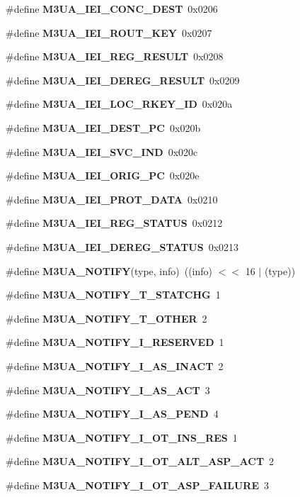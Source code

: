 \begin{DoxyCompactItemize}
\item 
\#define {\bf M3\+U\+A\+\_\+\+I\+E\+I\+\_\+\+C\+O\+N\+C\+\_\+\+D\+E\+ST}~0x0206
\item 
\#define {\bf M3\+U\+A\+\_\+\+I\+E\+I\+\_\+\+R\+O\+U\+T\+\_\+\+K\+EY}~0x0207
\item 
\#define {\bf M3\+U\+A\+\_\+\+I\+E\+I\+\_\+\+R\+E\+G\+\_\+\+R\+E\+S\+U\+LT}~0x0208
\item 
\#define {\bf M3\+U\+A\+\_\+\+I\+E\+I\+\_\+\+D\+E\+R\+E\+G\+\_\+\+R\+E\+S\+U\+LT}~0x0209
\item 
\#define {\bf M3\+U\+A\+\_\+\+I\+E\+I\+\_\+\+L\+O\+C\+\_\+\+R\+K\+E\+Y\+\_\+\+ID}~0x020a
\item 
\#define {\bf M3\+U\+A\+\_\+\+I\+E\+I\+\_\+\+D\+E\+S\+T\+\_\+\+PC}~0x020b
\item 
\#define {\bf M3\+U\+A\+\_\+\+I\+E\+I\+\_\+\+S\+V\+C\+\_\+\+I\+ND}~0x020c
\item 
\#define {\bf M3\+U\+A\+\_\+\+I\+E\+I\+\_\+\+O\+R\+I\+G\+\_\+\+PC}~0x020e
\item 
\#define {\bf M3\+U\+A\+\_\+\+I\+E\+I\+\_\+\+P\+R\+O\+T\+\_\+\+D\+A\+TA}~0x0210
\item 
\#define {\bf M3\+U\+A\+\_\+\+I\+E\+I\+\_\+\+R\+E\+G\+\_\+\+S\+T\+A\+T\+US}~0x0212
\item 
\#define {\bf M3\+U\+A\+\_\+\+I\+E\+I\+\_\+\+D\+E\+R\+E\+G\+\_\+\+S\+T\+A\+T\+US}~0x0213
\item 
\#define {\bf M3\+U\+A\+\_\+\+N\+O\+T\+I\+FY}(type,  info)~((info) $<$$<$ 16 $\vert$ (type))
\item 
\#define {\bf M3\+U\+A\+\_\+\+N\+O\+T\+I\+F\+Y\+\_\+\+T\+\_\+\+S\+T\+A\+T\+C\+HG}~1
\item 
\#define {\bf M3\+U\+A\+\_\+\+N\+O\+T\+I\+F\+Y\+\_\+\+T\+\_\+\+O\+T\+H\+ER}~2
\item 
\#define {\bf M3\+U\+A\+\_\+\+N\+O\+T\+I\+F\+Y\+\_\+\+I\+\_\+\+R\+E\+S\+E\+R\+V\+ED}~1
\item 
\#define {\bf M3\+U\+A\+\_\+\+N\+O\+T\+I\+F\+Y\+\_\+\+I\+\_\+\+A\+S\+\_\+\+I\+N\+A\+CT}~2
\item 
\#define {\bf M3\+U\+A\+\_\+\+N\+O\+T\+I\+F\+Y\+\_\+\+I\+\_\+\+A\+S\+\_\+\+A\+CT}~3
\item 
\#define {\bf M3\+U\+A\+\_\+\+N\+O\+T\+I\+F\+Y\+\_\+\+I\+\_\+\+A\+S\+\_\+\+P\+E\+ND}~4
\item 
\#define {\bf M3\+U\+A\+\_\+\+N\+O\+T\+I\+F\+Y\+\_\+\+I\+\_\+\+O\+T\+\_\+\+I\+N\+S\+\_\+\+R\+ES}~1
\item 
\#define {\bf M3\+U\+A\+\_\+\+N\+O\+T\+I\+F\+Y\+\_\+\+I\+\_\+\+O\+T\+\_\+\+A\+L\+T\+\_\+\+A\+S\+P\+\_\+\+A\+CT}~2
\item 
\#define {\bf M3\+U\+A\+\_\+\+N\+O\+T\+I\+F\+Y\+\_\+\+I\+\_\+\+O\+T\+\_\+\+A\+S\+P\+\_\+\+F\+A\+I\+L\+U\+RE}~3
\end{DoxyCompactItemize}
